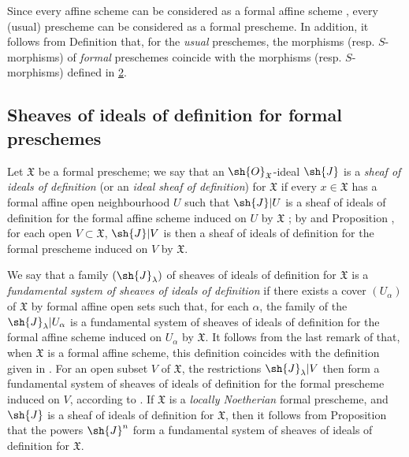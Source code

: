 \begin{env}[10.4.8]
\label{I.10.4.8}
Since every affine scheme can be considered as a formal affine scheme , every (usual) prescheme can be considered as a formal prescheme.
In addition, it follows from Definition  that, for the \emph{usual} preschemes, the morphisms (resp. $S$-morphisms) of \emph{formal} preschemes coincide with the morphisms (resp. $S$-morphisms) defined in \textsection\hyperref[section:I.2]{2}.
\end{env}

\subsection{Sheaves of ideals of definition for formal preschemes}
\label{subsection:I.10.5}

\begin{env}[10.5.1]
\label{I.10.5.1}
Let $\mathfrak{X}$ be a formal prescheme; we say that an $\sh{O}_\mathfrak{X}$-ideal $\sh{J}$ is a \emph{sheaf of ideals of definition} (or an \emph{ideal sheaf of definition}) for $\mathfrak{X}$ if every $x\in\mathfrak{X}$ has a formal affine open neighbourhood $U$ such that $\sh{J}|U$ is a sheaf of ideals of definition for the formal affine scheme induced on $U$ by $\mathfrak{X}$ ; by  and Proposition , for each open $V\subset\mathfrak{X}$, $\sh{J}|V$ is then a sheaf of ideals of definition for the formal prescheme induced on $V$ by $\mathfrak{X}$.

We say that a family $(\sh{J}_\lambda)$ of sheaves of ideals of definition for $\mathfrak{X}$ is a \emph{fundamental system}
\emph{of sheaves of ideals of definition} if there exists a cover $(U_\alpha)$ of $\mathfrak{X}$ by formal affine open sets such that, for each $\alpha$, the family of the $\sh{J}_\lambda|U_\alpha$ is a fundamental system of sheaves of ideals of definition  for the formal affine scheme induced on $U_\alpha$ by $\mathfrak{X}$.
It follows from the last remark of  that, when $\mathfrak{X}$ is a formal affine scheme, this definition coincides with the definition given in .
For an open subset $V$ of $\mathfrak{X}$, the restrictions $\sh{J}_\lambda|V$ then form a fundamental system of sheaves of ideals of definition for the formal prescheme induced on $V$, according to .
If $\mathfrak{X}$ is a \emph{locally Noetherian} formal prescheme, and $\sh{J}$ is a sheaf of ideals of definition for $\mathfrak{X}$, then it follows from Proposition  that the powers $\sh{J}^n$ form a fundamental system of sheaves of ideals of definition for $\mathfrak{X}$.
\end{env}

